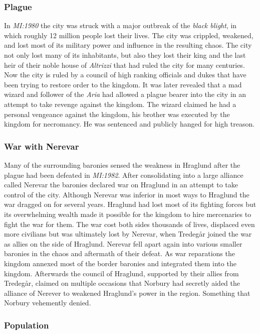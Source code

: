 \subsubsection*{Plague}

In \emph{MI:1980} the city was struck with a major outbreak of the
\emph{black blight}, in which roughly 12 million people lost their lives. The
city was crippled, weakened, and lost most of its military power and influence
in the resulting chaos. The city not only lost many of its inhabitants, but
also they lost their king and the last heir of their noble house of
\emph{Altrizzi} that had ruled the city for many centuries. Now the city is
ruled by a council of high ranking officials and dukes that have been trying
to restore order to the kingdom. It was later revealed that a mad wizard and
follower of the \emph{Aria} had allowed a plague bearer into the city in an
attempt to take revenge against the kingdom. The wizard claimed he had a
personal vengeance against the kingdom, his brother was executed by the kingdom
for necromancy. He was sentenced and publicly hanged for high treason.

\subsubsection*{War with Nerevar}

Many of the surrounding baronies sensed the weakness in Hraglund after the
plague had been defeated in \emph{MI:1982}. After consolidating into a large
alliance called Nerevar the baronies declared war on Hraglund in an attempt to
take control of the city. Although Nerevar was inferior in most ways to
Hraglund the war dragged on for several years.  Hraglund had lost most of its
fighting forces but its overwhelming wealth made it possible for the kingdom
to hire mercenaries to fight the war for them. The war cost both sides
thousands of lives, displaced even more civilians but was ultimately lost by
Nerevar, when Tredegår joined the war as allies on the side of
Hraglund. Nerevar fell apart again into various smaller baronies in the chaos
and aftermath of their defeat. As war reparations the kingdom annexed most of
the border baronies and integrated them into the kingdom. Afterwards the
council of Hraglund, supported by their allies from Tredegår, claimed on
multiple occasions that Norbury had secretly aided the alliance of Nerever to
weakened Hraglund's power in the region. Something that Norbury vehemently
denied.

\subsubsection*{Population}

